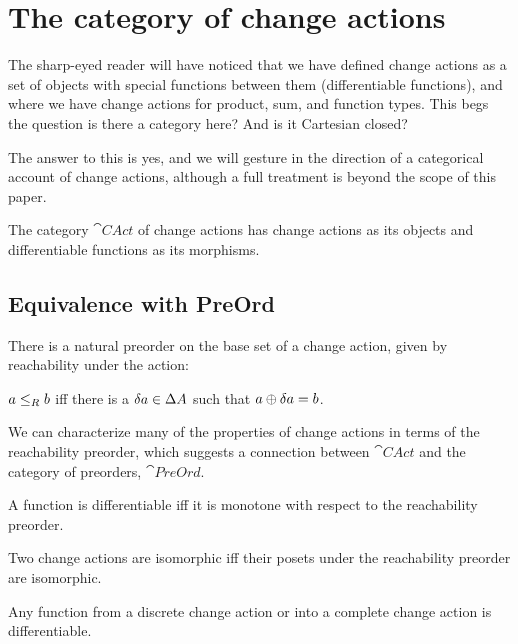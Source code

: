 \section{The category of change actions}
\label{sec:category}

The sharp-eyed reader will have noticed that we have defined change actions as a
set of objects with special functions between them (differentiable functions),
and where we have change actions for product, sum, and function types. This begs
the question \textemdash{} is there a category here? And is it Cartesian closed?

The answer to this is yes, and we will gesture in the direction of a categorical
account of change actions, although a full treatment is beyond the scope of this paper.

\begin{defn}
  The category $\cat{CAct}$ of change actions has change actions as its objects and
  differentiable functions as its morphisms. 
\end{defn}

\subsection{Equivalence with PreOrd}

There is a natural preorder on the base set of a change action, given by reachability
under the action:

\begin{defn}
  $a \leq_R b$ iff there is a $\delta a \in \Delta A$ such that $a \oplus
  \delta a = b$.
\end{defn}

We can characterize many of the properties of change actions in terms of the reachability preorder,
which suggests a connection between $\cat{CAct}$ and the category of preorders, $\cat{PreOrd}$.

\begin{prop}
  A function is differentiable iff it is monotone with respect to the
  reachability preorder. 
\end{prop}

\begin{corollary}
  Two change actions are isomorphic iff their posets under the reachability
  preorder are isomorphic.
\end{corollary}

\begin{corollary}
  Any function from a discrete change action or into a complete change
  action is differentiable.
\end{corollary}

